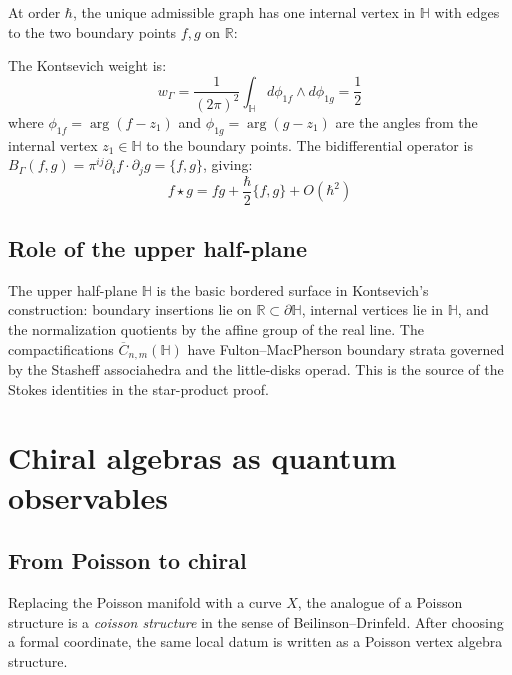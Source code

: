 \begin{example}
At order $\hbar$, the unique admissible graph has one internal vertex in $\mathbb{H}$ with edges to the two boundary points $f, g$ on $\mathbb{R}$:
\begin{center}
\end{center}

The Kontsevich weight is:
\[w_\Gamma = \frac{1}{(2\pi)^2}\int_{\mathbb{H}} d\phi_{1f} \wedge d\phi_{1g} = \frac{1}{2}\]
where $\phi_{1f} = \arg(f - z_1)$ and $\phi_{1g} = \arg(g - z_1)$ are the angles from the internal vertex $z_1 \in \mathbb{H}$ to the boundary points. The bidifferential operator is $B_\Gamma(f,g) = \pi^{ij}\partial_i f \cdot \partial_j g = \{f, g\}$, giving:
\[f \star g = fg + \frac{\hbar}{2}\{f,g\} + O(\hbar^2)\]
\end{example}

\subsection{Role of the upper half-plane}

The upper half-plane $\mathbb{H}$ is the basic bordered surface in
Kontsevich's construction: boundary insertions lie on
\(\mathbb R\subset\partial\mathbb H\), internal vertices lie in
\(\mathbb H\), and the normalization quotients by the affine group of
the real line. The compactifications
\(\overline C_{n,m}(\mathbb H)\) have Fulton--MacPherson boundary
strata governed by the Stasheff associahedra and the little-disks
operad. This is the source of the Stokes identities in the star-product
proof.

\section{Chiral algebras as quantum observables}

\subsection{From Poisson to chiral}

Replacing the Poisson manifold with a curve \(X\), the analogue of a
Poisson structure is a \emph{coisson structure} in the sense of
Beilinson--Drinfeld. After choosing a formal coordinate, the same local
datum is written as a Poisson vertex algebra structure.

